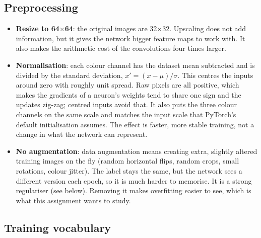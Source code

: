 \documentclass[11pt]{article}
\newcommand{\key}[1]{\textbf{#1}}
\begin{document}
\subsection{Preprocessing}

\begin{itemize}[noitemsep]
\item \key{Resize to 64$\times$64}: the original images are 32$\times$32. Upscaling does not add information, but it gives the network bigger feature maps to work with. It also makes the arithmetic cost of the convolutions four times larger.
\item \key{Normalisation}: each colour channel has the dataset mean subtracted and is divided by the standard deviation, $x' = (x-\mu)/\sigma$. This centres the inputs around zero with roughly unit spread. Raw pixels are all positive, which makes the gradients of a neuron's weights tend to share one sign and the updates zig-zag; centred inputs avoid that. It also puts the three colour channels on the same scale and matches the input scale that PyTorch's default initialisation assumes. The effect is faster, more stable training, not a change in what the network can represent.
\item \key{No augmentation}: data augmentation means creating extra, slightly altered training images on the fly (random horizontal flips, random crops, small rotations, colour jitter). The label stays the same, but the network sees a different version each epoch, so it is much harder to memorise. It is a strong regulariser (see below). Removing it makes overfitting easier to see, which is what this assignment wants to study.
\end{itemize}

\subsection{Training vocabulary}
\end{document}
